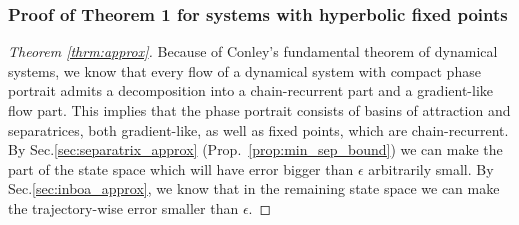 \documentclass{article}
\theoremstyle{definition}
\theoremstyle{remark}
\newcommand{\cl}{\operatorname{cl}}
\newcommand{\boa}{\operatorname{BoA}}
\newcounter{ct}
\begin{document}
%





\subsubsection{Proof of Theorem 1 for systems with hyperbolic fixed points}\label{sec:proof_fp_approx}
\begin{proof}[Theorem \ref{thrm:approx}]
Because of Conley's fundamental theorem of dynamical systems\citep{conley1978morse}, we know that every flow of a dynamical system with compact phase portrait admits a decomposition into a chain-recurrent part and a gradient-like flow part.
This implies that the phase portrait consists of basins of attraction and separatrices, both gradient-like, as well as fixed points, which are chain-recurrent.
%
By Sec.\ref{sec:separatrix_approx} (Prop.~\ref{prop:min_sep_bound}) we can make the part of the state space which will have error bigger than $\epsilon$ arbitrarily small. %
By Sec.\ref{sec:inboa_approx}, we know that in the remaining state space we can make the trajectory-wise error smaller than $\epsilon$.
\end{proof}
\end{document}
